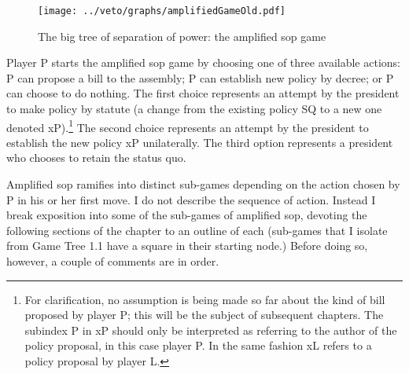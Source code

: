 \begin{figure}
 \begin{center}
  \texttt{[image: ../veto/graphs/amplifiedGameOld.pdf]}
 \caption{The big tree of separation of power: the amplified sop game}\label{f:amplifiedGame}
 \end{center}
\end{figure}

Player P starts the amplified sop game by choosing one of three available actions: P can propose a bill to the assembly; P can establish new policy by decree; or P can choose to do nothing.  The first choice represents an attempt by the president to make policy by statute (a change from the existing policy SQ to a new one denoted xP).\footnote{For clarification, no assumption is being made so far about the kind of bill proposed by player P; this will be the subject of subsequent chapters.  The subindex P in xP should only be interpreted as referring to the author of the policy proposal, in this case player P.  In the same fashion xL refers to a policy proposal by player L.}  The second choice represents an attempt by the president to establish the new policy xP unilaterally.  The third option represents a president who chooses to retain the status quo.  

Amplified sop ramifies into distinct sub-games depending on the action chosen by P in his or her first move.  I do not describe the sequence of action.  Instead I break exposition into some of the sub-games of amplified sop, devoting the following sections of the chapter to an outline of each (sub-games that I isolate from Game Tree 1.1 have a square in their starting node.)  Before doing so, however, a couple of comments are in order.  

